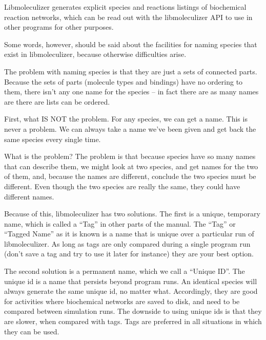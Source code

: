 Libmoleculizer generates explicit species and reactions listings of
biochemical reaction networks, which can be read out with the
libmoleculizer API to use in other programs for other purposes.  

Some words, however, should be said about the facilities for naming
species that exist in libmoleculizer, because otherwise difficulties
arise.  

The problem with naming species is that they are just a sets of
connected parts.  Because the sets of parts (molecule types and
bindings) have no ordering to them, there isn't any one name for the
species -- in fact there are as many names are there are lists can be
ordered.  

First, what IS NOT the problem.  For any species, we can get a name.
This is never a problem.  We can always take a name we've been given
and get back the same species every single time.  

What is the problem?  The problem is that because species have so many
names that can describe them, we might look at two species, and get
names for the two of them, and, because the names are different, 
conclude the two species must be different.  Even though the two
species are really the same, they could have different names. 

Because of this, libmoleculizer has two solutions.  The first is a
unique, temporary name, which is called a ``Tag'' in other parts of
the manual.  The ``Tag'' or ``Tagged Name'' as it is known is a name
that is unique over a particular run of libmoleculizer.  As long as
tags are only compared during a single program run (don't save a tag
and try to use it later for instance) they are your best option.

The second solution is a permanent name, which we call a ``Unique
ID''.  The unique id is a name that persists beyond program runs.  An
identical species will always generate the same unique id, no matter
what.  Accordingly, they are good for activities where biochemical
networks are saved to disk, and need to be compared between simulation
runs.  The downside to using unique ids is that they are slower, when
compared with tags.  Tags are preferred in all situations in which
they can be used.
